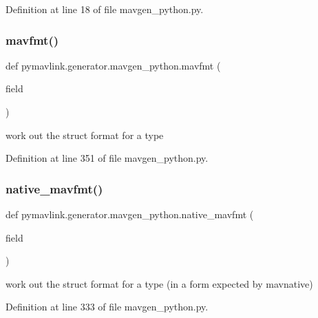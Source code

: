 Definition at line 18 of file mavgen\+\_\+python.\+py.

\mbox{\label{namespacepymavlink_1_1generator_1_1mavgen__python_aacfccd1b0104347f78648e168eac482d}} 
\subsubsection{\texorpdfstring{mavfmt()}{mavfmt()}}
{\footnotesize\ttfamily def pymavlink.\+generator.\+mavgen\+\_\+python.\+mavfmt (\begin{DoxyParamCaption}\item[{}]{field }\end{DoxyParamCaption})}

\begin{DoxyVerb}work out the struct format for a type\end{DoxyVerb}
 

Definition at line 351 of file mavgen\+\_\+python.\+py.

\mbox{\label{namespacepymavlink_1_1generator_1_1mavgen__python_aa80503aac0716bddd09ad1395f7dd2d5}} 
\subsubsection{\texorpdfstring{native\_mavfmt()}{native\_mavfmt()}}
{\footnotesize\ttfamily def pymavlink.\+generator.\+mavgen\+\_\+python.\+native\+\_\+mavfmt (\begin{DoxyParamCaption}\item[{}]{field }\end{DoxyParamCaption})}

\begin{DoxyVerb}work out the struct format for a type (in a form expected by mavnative)\end{DoxyVerb}
 

Definition at line 333 of file mavgen\+\_\+python.\+py.



